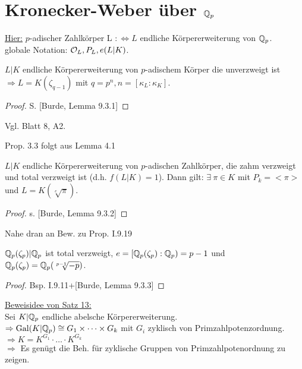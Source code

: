 \section{Kronecker-Weber über $\mathbb{Q}_p$}

\underline{Hier:} $p$-adischer Zahlkörper L $: \iff L$ endliche Körpererweiterung von $\mathbb{Q}_p$.\\
globale Notation: $\mathcal{O}_L, P_L, e(L|K)$.

\begin{Lem}
$L|K$ endliche Körpererweiterung von $p$-adischem Körper die unverzweigt ist\\
$\Rightarrow L=K(\zeta_{q-1})$ mit $q=p^n, n=[\kappa_L:\kappa_K]$.
\end{Lem}

\begin{proof}
S. [Burde, Lemma 9.3.1]
\end{proof}

\begin{Bem}
Vgl. Blatt 8, A2.
\end{Bem}

Prop. 3.3 folgt aus Lemma 4.1

\begin{Lem}
$L|K$ endliche Körpererweiterung von $p$-adischen Zahlkörper, die zahm verzweigt und total verzweigt ist (d.h. $f(L|K)=1$). Dann gilt: $\exists \ \pi \in K$ mit $P_k=<\pi>$ und $L=K(\sqrt[e]{\pi})$.
\end{Lem}

\begin{proof}
s. [Burde, Lemma 9.3.2]
\end{proof}

\begin{Bem}
Nahe dran an Bew. zu Prop. I.9.19
\end{Bem}

\begin{Lem}
$\mathbb{Q}_p(\zeta_p)|\mathbb{Q}_p$ ist total verzweigt, $e=[\mathbb{Q}_p(\zeta_p):\mathbb{Q}_p)=p-1$ und $\mathbb{Q}_p(\zeta_p)=\mathbb{Q}_p(\sqrt[p-1]{-p})$.
\end{Lem}

\begin{proof}
Bsp. I.9.11+[Burde, Lemma 9.3.3]
\end{proof}

\underline{Beweisidee von Satz 13:}\\
Sei $K|\mathbb{Q}_p$ endliche abelsche Körpererweiterung.\\
$\Rightarrow \operatorname{Gal}(K|\mathbb{Q}_p) \cong G_1 \times \dots \times G_k$ mit $G_i$ zyklisch von Primzahlpotenzordnung.\\
$\Rightarrow K=K^{G_1} \cdot \dots \cdot K^{G_k}$\\
$\Rightarrow$ Es genügt die Beh. für zyklische Gruppen von Primzahlpotenordnung zu zeigen.

